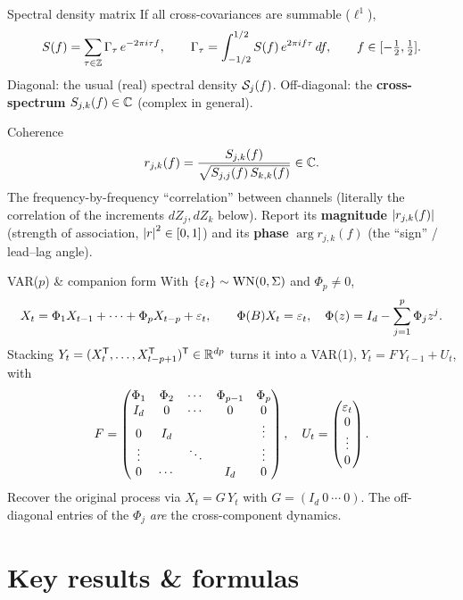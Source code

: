 \documentclass[11pt]{article}
\begin{document}
\begin{defn}{Spectral density matrix}
If all cross-covariances are summable ($\ell^1$),
\[
S(f)=\sum_{\tau\in\mathbb{Z}}\Gamma_\tau\,e^{-2\pi i\tau f},\qquad
\Gamma_\tau=\int_{-1/2}^{1/2}S(f)\,e^{2\pi if\tau}\,df,\qquad f\in[-\tfrac12,\tfrac12].
\]
Diagonal: the usual (real) spectral density $\mathcal{S}_j(f)$. Off-diagonal: the \textbf{cross-spectrum} $S_{j,k}(f)\in\mathbb{C}$ (complex in general).
\end{defn}

\begin{defn}{Coherence}
\[
r_{j,k}(f)=\frac{S_{j,k}(f)}{\sqrt{S_{j,j}(f)\,S_{k,k}(f)}}\in\mathbb{C} .
\]
The frequency-by-frequency ``correlation'' between channels (literally the correlation of the increments $dZ_j,dZ_k$ below). Report its \textbf{magnitude} $\left\lvert r_{j,k}(f) \right\rvert$ (strength of association, $\left\lvert r \right\rvert^2\in[0,1]$) and its \textbf{phase} $\arg r_{j,k}(f)$ (the ``sign'' / lead--lag angle).
\end{defn}

\begin{defn}{VAR($p$) \& companion form}
With $\{\varepsilon_t\}\sim\mathrm{WN}(0,\Sigma)$ and $\Phi_p\ne0$,
\[
X_t=\Phi_1 X_{t-1}+\cdots+\Phi_p X_{t-p}+\varepsilon_t,\qquad \Phi(B)X_t=\varepsilon_t,\quad \Phi(z)=I_d-\sum_{j=1}^p\Phi_j z^j .
\]
Stacking $Y_t=(X_t^{\mathsf{T}},\dots,X_{t-p+1}^{\mathsf{T}})^{\mathsf{T}}\in\mathbb{R}^{dp}$ turns it into a VAR(1), $Y_t=F\,Y_{t-1}+U_t$, with
\[
F=\begin{pmatrix}
\Phi_1 & \Phi_2 & \cdots & \Phi_{p-1} & \Phi_p\\
I_d & 0 & \cdots & 0 & 0\\
0 & I_d & & & \vdots\\
\vdots & & \ddots & & \vdots\\
0 & \cdots & & I_d & 0
\end{pmatrix},
\quad U_t=\begin{pmatrix}\varepsilon_t\\0\\\vdots\\0\end{pmatrix}.
\]
Recover the original process via $X_t=G\,Y_t$ with $G=(I_d\ 0\ \cdots\ 0)$. The off-diagonal entries of the $\Phi_j$ \emph{are} the cross-component dynamics.
\end{defn}

\section*{Key results \& formulas}
\end{document}

